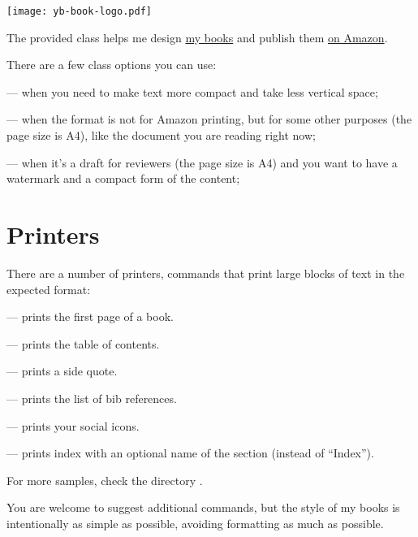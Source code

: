 \documentclass[compact,manuscript]{./yb-book}
\begin{document}
\texttt{[image: yb-book-logo.pdf]}
\vspace*{24pt}

\maketitle

The provided class  helps me design
\href{https://www.yegor256.com/books.html}{my books} and
publish them
\href{https://www.amazon.com/Yegor-Bugayenko/e/B01AM1QMDK}{on Amazon}.

There are a few class options you can use:

 --- when you need to make text more compact
and take less vertical space;

 --- when the format is not for Amazon printing,
but for some other purposes (the page size is A4), like the document
you are reading right now;

 --- when it's a draft for reviewers (the page size is A4)
and you want to have a watermark and a compact form of the content;

\section*{Printers}

There are a number of printers, commands that print large blocks of text
in the expected format:

 --- prints the first page of a book.

 --- prints the table of contents.

 --- prints a side quote.

 --- prints the list of bib references.

 --- prints your social icons.

 --- prints index with an optional name of the section (instead of ``Index'').

For more samples, check the directory .

You are welcome to suggest additional commands, but the style
of my books is intentionally as simple as possible, avoiding formatting
as much as possible.
\end{document}
